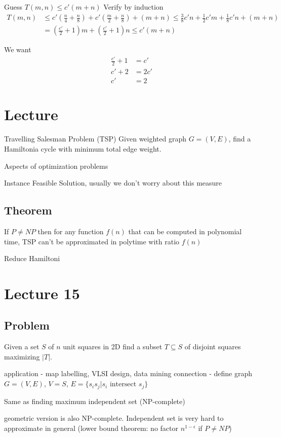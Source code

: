 \documentclass[english,12pt]{article}
\theoremstyle{plain}
\theoremstyle{definition}
\theoremstyle{definition} %
\begin{document}
Guess $T(m,n)\le c'(m+n)$
Verify by induction
\begin{align*}
T(m,n)&\le c'\left(\frac{n}{4}+\frac{n}{8}\right)+c'\left(\frac{m}{2}+\frac{n}{8}\right)+(m+n)
\le \frac{3}{8}c'n+\frac{1}{2}c'm+\frac{1}{8}c'n+(m+n)\\
&=\left(\frac{c'}{2}+1\right)m+\left(\frac{c'}{2}+1\right)n
\le c'(m+n)
\end{align*}

We want
\begin{align*}
\frac{c'}{2}+1&=c'\\
c'+2&=2c'\\
c'&=2
\end{align*}

\section{Lecture}
Travelling Salesman Problem (TSP)
Given weighted graph $G=(V,E)$, find a Hamiltonia cycle with minimum total edge weight.

Aspects of optimization problems

Instance
Feasible Solution, usually we don't worry about this measure

\subsection{Theorem}
If $P\ne NP$ then for any function $f(n)$ that can be computed in polynomial time, TSP can't be approximated in polytime with ratio $f(n)$

Reduce Hamiltoni


\section{Lecture 15}
\subsection{Problem}
Given a set $S$ of $n$ unit squares in 2D find a subset $T\subseteq S$ of disjoint squares maximizing $|T|$.

application - map labelling, VLSI design, data mining
connection - define graph $G=(V,E)$, $V=S$, $E=\{s_is_j|s_i \text{ intersect }s_j\}$

Same as finding maximum independent set (NP-complete)

geometric version is also NP-complete.  Independent set is very hard to approximate in general (lower bound theorem: no factor $n^{1-\epsilon}$ if $P\ne NP$)
\end{document}
